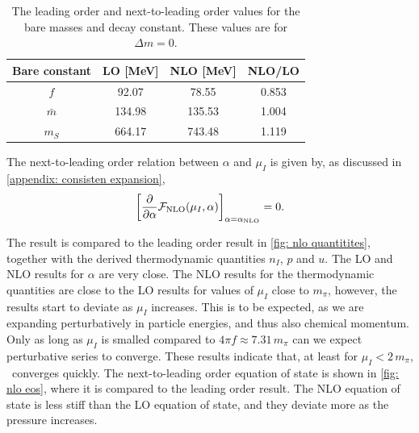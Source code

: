 \begin{table}[!htb]
    \centering
    \caption{The leading order and next-to-leading order values for the bare masses and decay constant. These values are for $\Delta m = 0$.}
    \label{table: nlo values}
    \begin{tabular}{c c c c}
        \hline \hline
        Bare constant & LO [MeV] & NLO [MeV] & NLO/LO \\
        \hline
        $f$ & 92.07 & 78.55 & 0.853\\
        $\bar m$ & 134.98 & 135.53 & 1.004 \\
        $m_S$ & 664.17 & 743.48 & 1.119 \\
        \hline
    \end{tabular}
\end{table}


The next-to-leading order relation between $\alpha$ and $\mu_I$ is given by, as discussed in \autoref{appendix: consisten expansion},
%
\begin{equation}
    \left[\pdv*{\mathcal{F}_\text{NLO}(\mu_I, \alpha)}{\alpha} \right]_{\alpha = \alpha_\text{NLO}} = 0.
\end{equation}
%

The result is compared to the leading order result in \autoref{fig: nlo quantitites}, together with the derived thermodynamic quantities $n_I$, $p$ and $u$.
The LO and NLO results for $\alpha$ are very close.
The NLO results for the thermodynamic quantities are close to the LO results for values of $\mu_I$ close to $m_\pi$, however, the results start to deviate as $\mu_I$ increases.
This is to be expected, as we are expanding perturbatively in particle energies, and thus also chemical momentum.
Only as long as $\mu_I$ is smalled compared to $4 \pi f \approx 7.31 \, m_\pi$ can we expect perturbative series to converge. 
These results indicate that, at least for $\mu_I< 2\,m_\pi$, \chpt\, converges quickly.
The next-to-leading order equation of state is shown in \autoref{fig: nlo eos}, where it is compared to the leading order result.
The NLO equation of state is less stiff than the LO equation of state, and they deviate more as the pressure increases.

